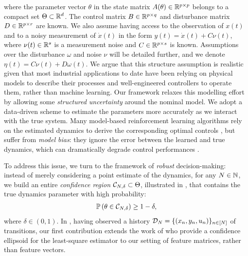 \documentclass{article}
\begin{document}
where the parameter vector $\theta$ in the state matrix $A(\theta)\in\mathbb{R}^{p\times p}$ belongs to a compact set $\Theta \subset \mathbb{R}^d$. The control matrix $B\in\mathbb{R}^{p\times q}$ and disturbance matrix $D\in\mathbb{R}^{p\times r}$ are known. We also assume having access to the observation of $x(t)$ and to a noisy measurement of $\dot{x}(t)$ in the form $y(t)=\dot{x}(t) + C\nu(t)$, where $\nu(t)\in\mathbb{R}^s$ is a measurement noise and $C\in\mathbb{R}^{p\times s}$ is known. Assumptions over the disturbance $\omega$ and noise $\nu$ will be detailed further, and we denote $\eta(t) = C\nu(t) + D\omega(t)$. We argue that this structure assumption is realistic given that most industrial applications to date have been relying on physical models to describe their processes and well-engineered controllers to operate them, rather than machine learning. Our framework relaxes this modelling effort by allowing some \emph{structured uncertainty} around the nominal model. We adopt a data-driven scheme to estimate the parameters more accurately as we interact with the true system. Many model-based reinforcement learning algorithms rely on the estimated dynamics to derive the corresponding optimal controls \citep[e.g.][]{Lenz2015,Levine2015}, but suffer from \emph{model bias}: they ignore the error between the learned and true dynamics, which can dramatically degrade control performances \citep{Schneider1997}. %

To address this issue, we turn to the framework of \emph{robust} decision-making: instead of merely considering a point estimate of the dynamics, for any $N\in\mathbb{N}$, we build an entire \emph{confidence region} $\mathcal{C}_{N,\delta}\subset\Theta$, illustrated in , that contains the true dynamics parameter with high probability:
\begin{align}
\mathbb{P}\left(\theta\in \mathcal{C}_{N,\delta}\right) \geq 1-\delta,
\label{eq:confidence}
\end{align}
where $\delta\in(0,1)$. In , having observed a history $\mathcal{D}_{N} = \{(x_n, y_n,u_n)\}_{n\in\left[N\right]}$ of transitions, our first contribution extends the work of \citet{Abbasi2011} who provide a confidence ellipsoid for the least-square estimator to our setting of feature matrices, rather than feature vectors. 
\end{document}
